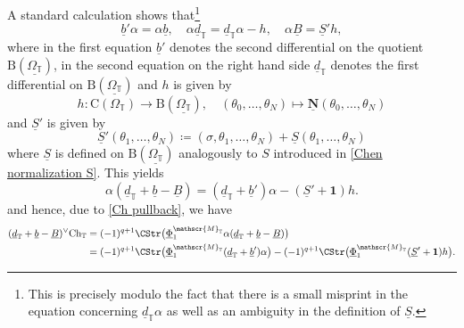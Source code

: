 \documentclass[a4paper, english, 12pt, bibliography=totocnumbered,
index=totoc]{scrartcl}
\begin{document}
A standard calculation shows that\footnote{This is precisely \cite[Equation
(5.7)]{GüneysuLudewig} modulo the fact that there is a small
misprint in the equation concerning $\underline{d}_{\mathbb{T}}\alpha$ as
well as an ambiguity in the definition of $\underline{S}$.}
\begin{equation*}
	\underline{b}' \alpha = \alpha \underline{b}, \quad \alpha
	\underline{d}_{\mathbb{T}} = \underline{d}_{\mathbb{T}} \alpha - h,
	\quad \alpha \underline{B} = \underline{S}' h,
\end{equation*}
where in the first equation $\underline{b}'$ denotes the second differential
on the quotient
$\mathrm{B}(\underline{\Omega_{\mathbb{T}}})$, in the second equation on the
right hand side $\underline{d}_{\mathbb{T}}$ denotes the first
differential on $\mathrm{B}(\underline{\Omega_{\mathbb{T}}})$ and $h$ is
given by
\begin{equation*}
	h \colon \mathrm{C}(\Omega_{\mathbb{T}}) \to
	\mathrm{B}(\underline{\Omega_{\mathbb{T}}}), \quad (\theta_0, \ldots,
	\theta_N) \mapsto \underline{\mathbf{N}}(\theta_0, \ldots, \theta_N)
\end{equation*}
and $\underline{S}'$ is given by
\begin{equation*}
	\underline{S}'(\theta_1, \ldots, \theta_N) \coloneqq (\sigma,
	\theta_1,
	\ldots, \theta_N) + \underline{S}(\theta_1, \ldots, \theta_N)
\end{equation*}
where $\underline{S}$ is defined on
$\mathrm{B}(\underline{\Omega_{\mathbb{T}}})$ analogously to $S$ introduced
in \cref{Chen normalization S}.
This yields
\begin{equation}\label{Interaction alpha}
	\alpha(\underline{d}_{\mathbb{T}} + \underline{b} - \underline{B}) =
	(\underline{d}_{\mathbb{T}} + \underline{b}')\alpha - (\underline{S}' +
	\mathbf{1})h.
\end{equation}
and hence, due to \cref{Ch pullback}, we have
\begin{align*}
	(\underline{d}_{\mathbb{T}} + \underline{b} - \underline{B})^{\vee}
	\mathrm{Ch}_{\mathbb{T}} &= (-1)^{q+1} \CStr\big(
	\underline{\Phi}_1^{\mathscr{M}_{\mathbb{T}}} \alpha
	(\underline{d}_{\mathbb{T}} + \underline{b} - \underline{B})\big) \\
	\notag
	& = (-1)^{q+1} \CStr\big(
	\underline{\Phi}_1^{\mathscr{M}_{\mathbb{T}}}
	(\underline{d}_{\mathbb{T}} + \underline{b}')\alpha\big) - (-1)^{q+1}
	\CStr\big(
	\underline{\Phi}_1^{\mathscr{M}_{\mathbb{T}}}(\underline{S}' +
	\mathbf{1})h\big).
\end{align*}
\end{document}
